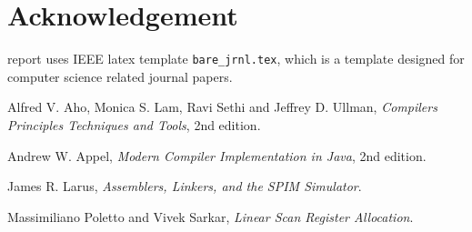 \documentclass[journal]{IEEEtran}
\begin{document}
\section*{Acknowledgement}


 report uses IEEE latex template \texttt{bare\_jrnl.tex}, which is a template designed for computer science related journal papers.


\ifCLASSOPTIONcaptionsoff
  \newpage
\fi





%
%
%
\begin{thebibliography}{1}

Alfred V. Aho, Monica S. Lam, Ravi Sethi and Jeffrey D. Ullman, \emph{Compilers Principles Techniques and Tools}, 2nd edition. 

Andrew W. Appel, \emph{Modern Compiler Implementation in Java}, 2nd edition. 

James R. Larus, \emph{Assemblers, Linkers, and the SPIM Simulator}.

Massimiliano Poletto and Vivek Sarkar, \emph{Linear Scan Register Allocation}.

\end{thebibliography}

% 
\end{document}
